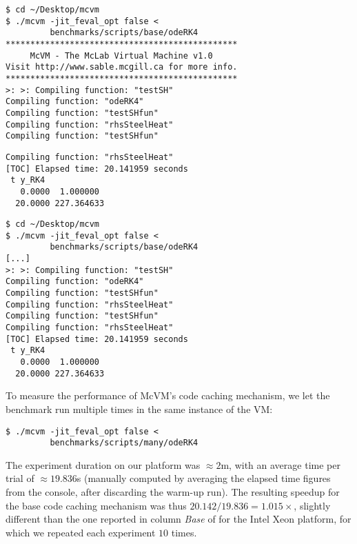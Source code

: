 \ifdefined \separateAEdoc
\begin{small}
\begin{verbatim}
$ cd ~/Desktop/mcvm
$ ./mcvm -jit_feval_opt false <
         benchmarks/scripts/base/odeRK4
***********************************************
     McVM - The McLab Virtual Machine v1.0
Visit http://www.sable.mcgill.ca for more info.
***********************************************
>: >: Compiling function: "testSH"
Compiling function: "odeRK4"
Compiling function: "testSHfun"
Compiling function: "rhsSteelHeat"
Compiling function: "testSHfun"
\end{verbatim}
\begin{verbatim}
Compiling function: "rhsSteelHeat"
[TOC] Elapsed time: 20.141959 seconds
 t y_RK4
   0.0000  1.000000
  20.0000 227.364633
\end{verbatim}
\end{small}
\else
\begin{small}
\begin{verbatim}
$ cd ~/Desktop/mcvm
$ ./mcvm -jit_feval_opt false <
         benchmarks/scripts/base/odeRK4
[...]
>: >: Compiling function: "testSH"
Compiling function: "odeRK4"
Compiling function: "testSHfun"
Compiling function: "rhsSteelHeat"
Compiling function: "testSHfun"
Compiling function: "rhsSteelHeat"
[TOC] Elapsed time: 20.141959 seconds
 t y_RK4
   0.0000  1.000000
  20.0000 227.364633
\end{verbatim}
\end{small}
\fi

\noindent To measure the performance of McVM's code caching mechanism, we let the benchmark run multiple times in the same instance of the VM:

\begin{small}
\begin{verbatim}
$ ./mcvm -jit_feval_opt false <
         benchmarks/scripts/many/odeRK4
\end{verbatim}
\end{small}

\noindent The experiment duration on our platform was $\approx2$m, with an average time per trial of $\approx 19.836$s (manually computed by averaging the elapsed time figures from the console, after discarding the warm-up run). The resulting speedup for the base code caching mechanism was thus $20.142/19.836=1.015\times$, slightly different than the one reported in column {\em Base} of  for the Intel Xeon platform, for which we repeated each experiment $10$ times.

